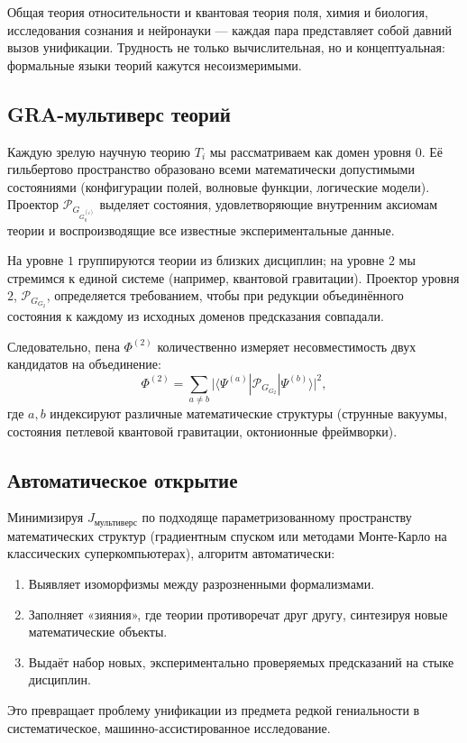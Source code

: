 \documentclass[11pt,a4paper]{article}
\theoremstyle{definition}
\newcommand{\pG}{\mathcal{P}_{\!G}}
\newcommand{\Foam}{\Phi}
\newcommand{\Jfunc}{J_{\text{мультиверс}}}
\begin{document}
Общая теория относительности и квантовая теория поля, химия и биология, исследования сознания и нейронауки — каждая пара представляет собой давний вызов унификации. Трудность не только вычислительная, но и концептуальная: формальные языки теорий кажутся несоизмеримыми.

\subsection{GRA-мультиверс теорий}

Каждую зрелую научную теорию $T_i$ мы рассматриваем как домен уровня $0$. Её гильбертово пространство образовано всеми математически допустимыми состояниями (конфигурации полей, волновые функции, логические модели). Проектор $\pG_{G_0^{(i)}}$ выделяет состояния, удовлетворяющие внутренним аксиомам теории и воспроизводящие все известные экспериментальные данные.

На уровне $1$ группируются теории из близких дисциплин; на уровне $2$ мы стремимся к единой системе (например, квантовой гравитации). Проектор уровня $2$, $\pG_{G_2}$, определяется требованием, чтобы при редукции объединённого состояния к каждому из исходных доменов предсказания совпадали.

Следовательно, пена $\Foam^{(2)}$ количественно измеряет несовместимость двух кандидатов на объединение:
\[
\Foam^{(2)} = \sum_{a\neq b} \bigl| \langle \Psi^{(a)} | \pG_{G_2} | \Psi^{(b)} \rangle \bigr|^2,
\]
где $a,b$ индексируют различные математические структуры (струнные вакуумы, состояния петлевой квантовой гравитации, октонионные фреймворки).

\subsection{Автоматическое открытие}

Минимизируя $\Jfunc$ по подходяще параметризованному пространству математических структур (градиентным спуском или методами Монте-Карло на классических суперкомпьютерах), алгоритм автоматически:
\begin{enumerate}
    \item Выявляет изоморфизмы между разрозненными формализмами.
    \item Заполняет «зияния», где теории противоречат друг другу, синтезируя новые математические объекты.
    \item Выдаёт набор новых, экспериментально проверяемых предсказаний на стыке дисциплин.
\end{enumerate}
Это превращает проблему унификации из предмета редкой гениальности в систематическое, машинно-ассистированное исследование.
\end{document}

